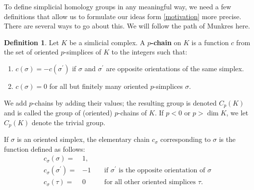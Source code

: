 \documentclass[toc=bib]{scrartcl}
\theoremstyle{plain}
\theoremstyle{definition}
\newtheorem	{definition}[theorem]{Definition}
\theoremstyle{remark}
\begin{document}
%
%
%
%
%
%

To define simplicial homology groups in any meaningful way, we need a few definitions that allow us to formulate our ideas form \autoref{motivation} more precise. There are several ways to go about this. We will follow the path of Munkres \cite[p. 27]{mu} here.

\begin{definition}\label{def-chain}
	Let $K$ be a simlicial complex. A \textbf{$p$-chain} on $K$ is a function $c$ from the set of oriented $p$-simplices of $K$ to the integers such that:
	\begin{enumerate}
		\item $c(\sigma)=-c(\sigma^\prime)$ if $\sigma$ and $\sigma^\prime$ are opposite orientations of the same simplex.
		\item $c(\sigma)=0$ for all but finitely many oriented $p$-simplices $\sigma$.
	\end{enumerate}
We add $p$-chains by adding their values; the resulting group is denoted $C_p(K)$ and is called the group of (oriented) $p$-chains of $K$. If $p<0$ or $p>\dim K$, we let $C_p(K)$ denote the trivial group.

If $\sigma$ is an oriented simplex, the elementary chain $c_\sigma$ corresponding to $\sigma$ is the function defined as follows:
\begin{align*}c_\sigma(\sigma)=&1,\\
 c_\sigma(\sigma^\prime)=&-1&&\text{ if $\sigma^\prime$ is the opposite orientation of $\sigma$}\\
 c_\sigma(\tau)=&0 &&\text{ for all other oriented simplices $\tau$.} 
 \end{align*}
\end{definition}
\end{document}
